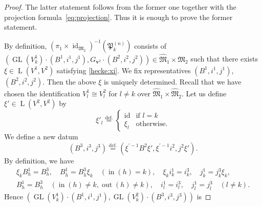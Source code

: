 \documentclass[12pt]{amsart}
\def\frak{\mathfrak}
\theoremstyle{definition}
\theoremstyle{remark}
\numberwithin{equation}{subsection}
\newcommand{\defeq}{\overset{\operatorname{\scriptstyle def.}}{=}}
\newcommand{\GL}{\operatorname{GL}}
\newcommand{\id}{\operatorname{id}}
\newcommand{\vin}{\operatorname{in}} %
\newcommand{\vout}{\operatorname{out}} %
\newcommand{\M}{{\frak M}} %
\newcommand{\bv}{{\mathbf v}} %
\newcommand{\Pa}{{\frak P}} %
\newcommand{\HomL}{\operatorname{L}}
\newcommand{\Mpp}{\widehat\M}
\begin{document}
\begin{proof}
The latter statement follows from the former one together with the
projection formula~\eqref{eq:projection}. Thus it is enough to prove
the former statement.

By definition, $(\pi_1\times\id_{\M_2})^{-1}(\Pa_k^{(n)})$ consists of
$(\GL(V^1_k)\cdot(B^1,i^1,j^1), G_{\bv^2}\cdot (B^2,i^2,j^2)) \in
\Mpp_1\times\M_2$ such that there exists $\xi\in\HomL(V^1, V^2)$
satisfying \eqref{hecke:xi}. We fix representatives
$(B^1,i^1,j^1)$, $(B^2,i^2,j^2)$. Then the above $\xi$ is uniquely
determined. Recall that we have chosen the identification
$V^1_l\cong V^2_l$ for $l\neq k$ over $\Mpp_1\times\Mpp_2$.
Let us define $\xi'\in \HomL(V^2,V^2)$ by
\begin{equation*}
  \xi'_l \defeq 
  \begin{cases}
    \id & \text{if $l = k$} \\
    \xi_l & \text{otherwise}.
  \end{cases}
\end{equation*}
We define a new datum
\begin{equation*}
(B^3, i^3, j^3) \defeq
  (\xi^{\prime-1}B^2 \xi', \xi^{\prime-1}i^2, j^2\xi').
\end{equation*}
By definition, we have
\begin{gather*}
  \xi_k B^1_h = B^3_h, \quad
  B^1_{\overline{h}} = B^3_{\overline{h}}\xi_k
  \quad(\vin(h) = k), \quad
  \xi_k i^1_k = i^3_k , \quad j^1_k = j^3_k\xi_k, \\
   B^1_h = B^3_h \quad (\vin(h)\neq k, \vout(h)\neq k), \quad
   i^1_l = i^3_l, \quad j^1_l = j^3_l \quad(l\neq k).
\end{gather*}
Hence $(\GL(V^1_k)\cdot (B^1,i^1,j^1), \GL(V^2_k)\cdot (B^3,i^3,j^3))$ is

\end{proof}
\end{document}
